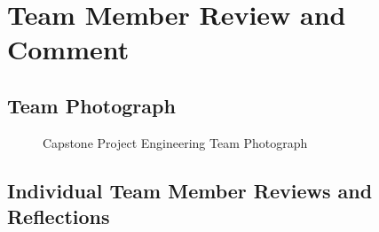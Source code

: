 \chapter{Team Member Review and Comment}
\label{chap:team_review}

\section{Team Photograph}
\label{sec:team_photograph}

\begin{figure}[htbp]
    \centering
    \setlength{\fboxrule}{1pt}%
    \setlength{\fboxsep}{20pt}%
    \caption{Capstone Project Engineering Team Photograph}
    \label{fig:team_photo}
\end{figure}

\vspace{0.4cm}

\section{Individual Team Member Reviews and Reflections}
\label{sec:individual_reviews}

